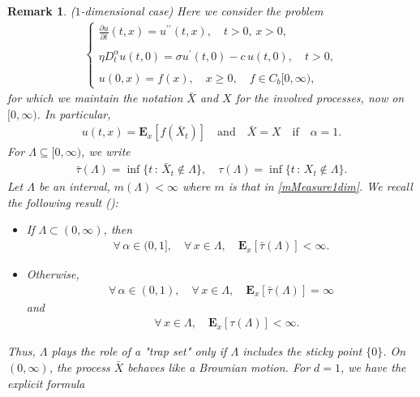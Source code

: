 \documentclass[11pt,a4paper]{article}
\newtheorem{remark}{Remark}[section]
\begin{document}
\begin{remark}
($1$-dimensional case) Here we consider the problem 
\begin{align}
\label{FBVP-realLine}
\left\lbrace
\begin{array}{ll}
\displaystyle \frac{\partial u}{\partial t}(t,x) = u^{\prime \prime}(t,x), \quad t>0, \, x >0,\\
\\
\displaystyle \eta D^\alpha_t u(t,0) = \sigma u^\prime(t,0) - c\, u(t, 0), \quad t>0,\\
\\
\displaystyle u(0,x) = f(x), \quad x \geq 0, \quad f \in C_b[0, \infty),
\end{array}
\right.
\end{align}
for which we maintain the notation $\bar{X}$ and $X$ for the involved processes, now on $[0, \infty)$.  In particular,
\begin{align*}
u(t,x) = \mathbf{E}_x[f(\bar{X}_t)] \quad \textrm{and} \quad \bar{X}=X \quad \textrm{if} \quad \alpha=1.
\end{align*}
For $\Lambda \subseteq [0, \infty)$, we write
\begin{align*}
\bar{\tau}(\Lambda) = \inf\{t\,:\, \bar{X}_t \notin \Lambda \}, \quad \tau(\Lambda) = \inf\{t\,:\, X_t \notin \Lambda \}.
\end{align*}
Let $\Lambda$ be an interval, $m(\Lambda)<\infty$ where $m$ is that in \eqref{mMeasure1dim}. We recall the following result (\cite[Lemma 3]{NLBVP-ItheHline}):
\begin{itemize}
\item [i)] If $\Lambda \subset (0, \infty)$, then 
\begin{align*}
\forall\, \alpha \in (0,1], \quad \forall\, x \in \Lambda, \quad \mathbf{E}_x[\bar{\tau}(\Lambda) ]< \infty.
\end{align*} 
\item [ii)] Otherwise, 
\begin{align*}
\forall\, \alpha \in (0,1), \quad \forall\, x \in \Lambda, \quad \mathbf{E}_x[\bar{\tau}(\Lambda) ] = \infty
\end{align*}
and
\begin{align*}
\quad \forall\, x \in \Lambda, \quad \mathbf{E}_x[\tau(\Lambda) ] < \infty.
\end{align*}
\end{itemize} 
Thus, $\Lambda$ plays the role of a "trap set" only if $\Lambda$ includes the sticky point $\{0\}$. On $(0, \infty)$, the process $\bar{X}$ behaves like a Brownian motion. For $d=1$, we have the explicit formula

\end{remark}
\end{document}
